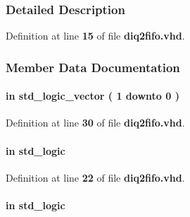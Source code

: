 \subsubsection{Detailed Description}


Definition at line {\bf 15} of file {\bf diq2fifo.\+vhd}.



\subsubsection{Member Data Documentation}
\paragraph[{ch\+\_\+en}]{ {\bfseries \textcolor{keywordflow}{in}\textcolor{vhdlchar}{ }} {\bfseries \textcolor{comment}{std\+\_\+logic\+\_\+vector}\textcolor{vhdlchar}{ }\textcolor{vhdlchar}{(}\textcolor{vhdlchar}{ }\textcolor{vhdlchar}{ } \textcolor{vhdldigit}{1} \textcolor{vhdlchar}{ }\textcolor{keywordflow}{downto}\textcolor{vhdlchar}{ }\textcolor{vhdlchar}{ } \textcolor{vhdldigit}{0} \textcolor{vhdlchar}{ }\textcolor{vhdlchar}{)}\textcolor{vhdlchar}{ }} \hspace{0.3cm}{\ttfamily [Port]}}\label{classdiq2fifo_a6494f316f504075c4ccf47146756d576}


Definition at line {\bf 30} of file {\bf diq2fifo.\+vhd}.

\paragraph[{clk}]{ {\bfseries \textcolor{keywordflow}{in}\textcolor{vhdlchar}{ }} {\bfseries \textcolor{comment}{std\+\_\+logic}\textcolor{vhdlchar}{ }} \hspace{0.3cm}{\ttfamily [Port]}}\label{classdiq2fifo_a4a4609c199d30b3adebbeb3a01276ec5}


Definition at line {\bf 22} of file {\bf diq2fifo.\+vhd}.

\paragraph[{ddr\+\_\+en}]{ {\bfseries \textcolor{keywordflow}{in}\textcolor{vhdlchar}{ }} {\bfseries \textcolor{comment}{std\+\_\+logic}\textcolor{vhdlchar}{ }} \hspace{0.3cm}{\ttfamily [Port]}}\label{classdiq2fifo_adbfe05e6692f69f8e592df06c6055f0a}


